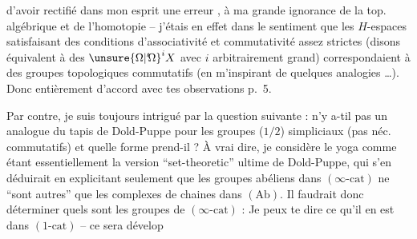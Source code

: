 d'avoir rectifié dans mon esprit une erreur ,  à ma grande ignorance de la top. algébrique et de l'homotopie -- j'étais en effet dans le sentiment que les $H$-espaces satisfaisant des conditions d'associativité et commutativité assez strictes (disons équivalent à des ${\unsure{\Omega|{}'\!\Omega}}^{i}X$ avec $i$ arbitrairement grand) correspondaient à des groupes topologiques commutatifs (en m'inspirant de quelques analogies \dots). Donc entièrement d'accord avec tes observations p.~5.

Par contre, je suis toujours intrigué par la question suivante : n'y a-til pas un analogue du tapis de Dold-Puppe pour les groupes ($1/2$) simpliciaux (pas néc. commutatifs) et quelle forme prend-il ? À vrai dire, je considère le yoga
comme étant essentiellement la version ``set-theoretic'' ultime de Dold-Puppe, qui s'en déduirait en explicitant seulement que les groupes abéliens dans $(\infty\text{-cat})$ ne ``sont autres'' que les complexes de chaines dans $(\mathrm{Ab})$. Il faudrait donc déterminer quels sont les groupes de $(\infty\text{-cat})$ : Je peux te dire ce qu'il en est dans $(1\text{-cat})$ -- ce sera dévelop%

